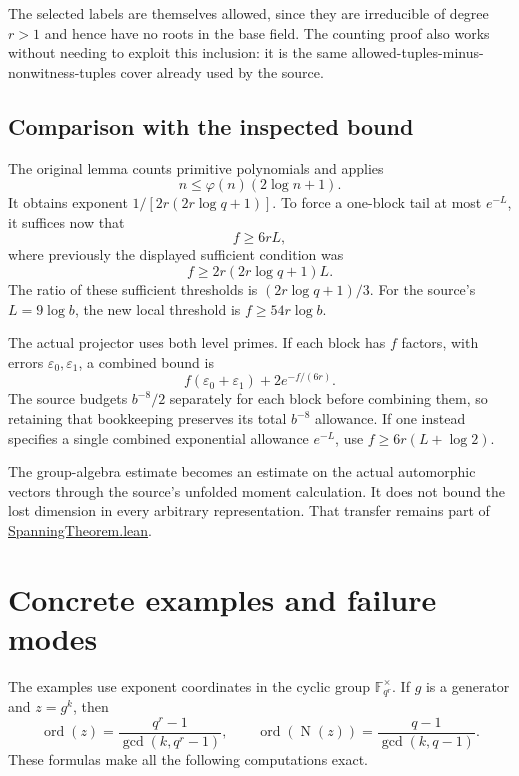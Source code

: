 \documentclass[11pt,a4paper]{article}
\theoremstyle{definition}
\theoremstyle{remark}
\newcommand{\F}{\mathbb F}
\newcommand{\ord}{\operatorname{ord}}
\newcommand{\Norm}{\operatorname{N}}
\newcommand{\src}[2]{\href{https://github.com/VladimirReshetnikov/ProveIt/blob/89d12dd40424f1217fd818d84877b3da52396a3b/Analysis/GeneralizedRiemannHypothesis/Lean/grh/src/#1.lean}{#2}}
\begin{document}
The selected labels are themselves allowed, since they are irreducible of degree
\(r>1\) and hence have no roots in the base field. The counting proof also works
without needing to exploit this inclusion: it is the same allowed-tuples-minus-
nonwitness-tuples cover already used by the source.

\subsection{Comparison with the inspected bound}

The original lemma counts primitive polynomials and applies
\[
                   n\le\varphi(n)(2\log n+1).
\]
It obtains exponent \(1/[2r(2r\log q+1)]\).
To force a one-block tail at most \(e^{-L}\), it suffices now that
\[
                         f\ge6rL,
\]
where previously the displayed sufficient condition was
\[
                         f\ge2r(2r\log q+1)L.
\]
The ratio of these sufficient thresholds is \((2r\log q+1)/3\).
For the source's \(L=9\log b\), the new local threshold is
\(f\ge54r\log b\).

The actual projector uses both level primes. If each block has \(f\) factors,
with errors \(\varepsilon_0,\varepsilon_1\), a combined bound is
\begin{equation}
       f(\varepsilon_0+\varepsilon_1)+2e^{-f/(6r)}.
       \label{eq:twoblock}
\end{equation}
The source budgets \(b^{-8}/2\) separately for each block before combining them,
so retaining that bookkeeping preserves its total \(b^{-8}\) allowance.
If one instead specifies a single combined exponential allowance \(e^{-L}\),
use \(f\ge6r(L+\log2)\).

The group-algebra estimate becomes an estimate on the actual automorphic vectors
through the source's unfolded moment calculation. It does not bound the lost
dimension in every arbitrary representation. That transfer remains part of
\src{New/Spanning/SecondMoment/SpanningTheorem}{SpanningTheorem.lean}.

\section{Concrete examples and failure modes}
\label{sec:examples}

The examples use exponent coordinates in the cyclic group \(\F_{q^r}^\times\).
If \(g\) is a generator and \(z=g^k\), then
\[
       \ord(z)=\frac{q^r-1}{\gcd(k,q^r-1)},\qquad
       \ord(\Norm(z))=\frac{q-1}{\gcd(k,q-1)}.
\]
These formulas make all the following computations exact.
\end{document}
